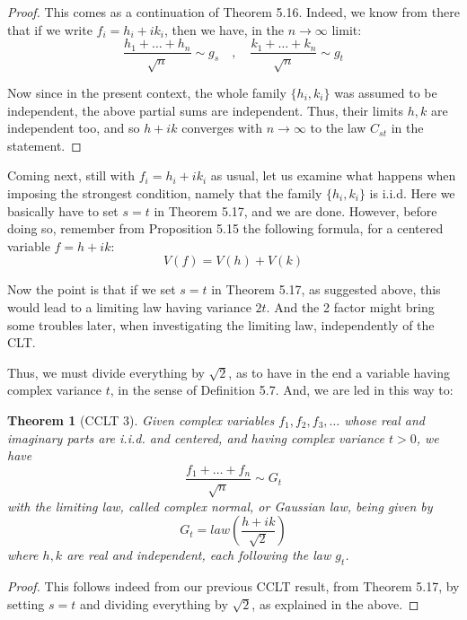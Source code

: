 \documentclass[12pt]{amsbook}
\newtheorem{theorem}{Theorem}[chapter]
\begin{document}
\begin{proof}
This comes as a continuation of Theorem 5.16. Indeed, we know from there that if we write $f_i=h_i+ik_i$, then we have, in the $n\to\infty$ limit:
$$\frac{h_1+\ldots+h_n}{\sqrt{n}}\sim g_s\quad,\quad \frac{k_1+\ldots+k_n}{\sqrt{n}}\sim g_t$$

Now since in the present context, the whole family $\{h_i,k_i\}$ was assumed to be independent, the above partial sums are independent. Thus, their limits $h,k$ are independent too, and so $h+ik$ converges with $n\to\infty$ to the law $C_{st}$ in the statement.
\end{proof}

Coming next, still with $f_i=h_i+ik_i$ as usual, let us examine what happens when imposing the strongest condition, namely that the family $\{h_i,k_i\}$ is i.i.d. Here we basically have to set $s=t$ in Theorem 5.17, and we are done. However, before doing so, remember from Proposition 5.15 the following formula, for a centered variable $f=h+ik$:
$$V(f)=V(h)+V(k)$$ 

Now the point is that if we set $s=t$ in Theorem 5.17, as suggested above, this would lead to a limiting law having variance $2t$. And the 2 factor might bring some troubles later, when investigating the limiting law, independently of the CLT.

\bigskip

Thus, we must divide everything by $\sqrt{2}$, as to have in the end a variable having complex variance $t$, in the sense of Definition 5.7. And, we are led in this way to:


\begin{theorem}[CCLT 3]
Given complex variables $f_1,f_2,f_3,\ldots$ whose real and imaginary parts are i.i.d. and centered, and having complex variance $t>0$, we have
$$\frac{f_1+\ldots+f_n}{\sqrt{n}}\sim G_t$$
with the limiting law, called complex normal, or Gaussian law, being given by
$$G_t=law\left(\frac{h+ik}{\sqrt{2}}\right)$$
where $h,k$ are real and independent, each following the law $g_t$.
\end{theorem}

\begin{proof}
This follows indeed from our previous CCLT result, from Theorem 5.17, by setting $s=t$ and dividing everything by $\sqrt{2}$, as explained in the above.
\end{proof}
\end{document}
